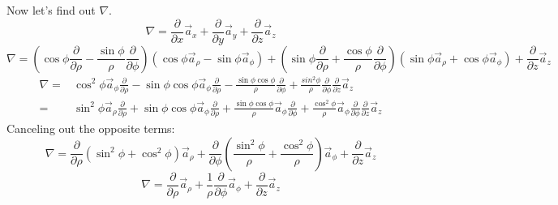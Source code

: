                 Now let's find out $\nabla$.
                $$\nabla = \frac{\partial}{\partial x}\vec{a}_x + 
                    \frac{\partial}{\partial y}\vec{a}_y +
                    \frac{\partial}{\partial z}\vec{a}_z
                $$
                $$
                    \nabla = \left(\cos\phi\frac{\partial}{\partial \rho} - \frac{\sin\phi}{\rho}\frac{\partial}{\partial \phi}\right)\left(\cos\phi\vec{a}_\rho - \sin\phi\vec{a}_\phi\right) +
                    \left(\sin\phi\frac{\partial}{\partial \rho} + \frac{\cos\phi}{\rho}\frac{\partial}{\partial \phi}\right)\left(\sin\phi\vec{a}_\rho + \cos\phi\vec{a}_\phi\right) + \frac{\partial}{\partial z}\vec{a}_z
                $$
                \begin{align*}
                    \nabla = & \cos^2\phi\vec{a}_\phi\frac{\partial}{\partial \rho} - \sin\phi\cos\phi\vec{a}_\phi\frac{\partial}{\partial \rho} - \frac{\sin\phi\cos\phi}{\rho}\frac{\partial}{\partial \phi} + \frac{sin^2\phi}{\rho}\frac{\partial}{\partial \phi} \frac{\partial}{\partial z}\vec{a}_z\\
                    = & \sin^2\phi\vec{a}_\rho\frac{\partial}{\partial \rho} + \sin\phi\cos\phi\vec{a}_\phi\frac{\partial}{\partial \rho} + \frac{\sin\phi\cos\phi}{\rho}\vec{a}_\phi\frac{\partial}{\partial\phi} + \frac{\cos^2\phi}{\rho}\vec{a}_\phi\frac{\partial}{\partial \phi} \frac{\partial}{\partial z}\vec{a}_z
                \end{align*}
                Canceling out the opposite terms:
                $$
                    \nabla = \frac{\partial}{\partial \rho}\left(\sin^2\phi + \cos^2\phi\right)\vec{a}_\rho + \frac{\partial}{\partial \phi}\left(\frac{\sin^2\phi}{\rho} + \frac{\cos^2\phi}{\rho}\right)\vec{a}_\phi + \frac{\partial}{\partial z}\vec{a}_z
                $$
                \begin{equation}
                    \nabla = \frac{\partial}{\partial \rho}\vec{a}_\rho + \frac{1}{\rho}\frac{\partial}{\partial\phi}\vec{a}_\phi + \frac{\partial}{\partial z}\vec{a}_z
                \end{equation}